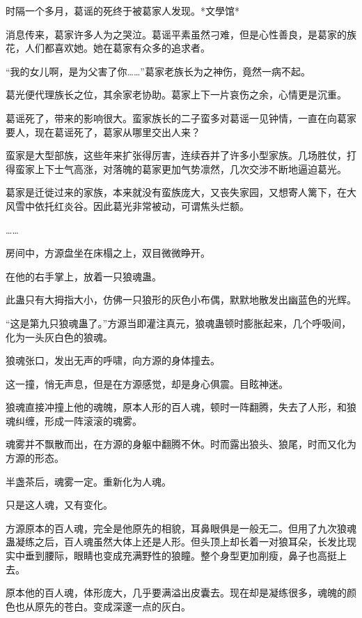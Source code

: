 
\begin{this_body}

时隔一个多月，葛谣的死终于被葛家人发现。*文學馆*

消息传来，葛家许多人为之哭泣。葛谣平素虽然刁难，但是心性善良，是葛家的族花，人们都喜欢她。她在葛家有众多的追求者。

“我的女儿啊，是为父害了你……”葛家老族长为之神伤，竟然一病不起。

葛光便代理族长之位，其余家老协助。葛家上下一片哀伤之余，心情更是沉重。

葛谣死了，带来的影响很大。蛮家族长的二子蛮多对葛谣一见钟情，一直在向葛家要人，现在葛谣死了，葛家从哪里交出人来？

蛮家是大型部族，这些年来扩张得厉害，连续吞并了许多小型家族。几场胜仗，打得蛮家上下士气高涨，对落魄的葛家更加气势凛然，几次交涉不断地逼迫葛光。

葛家是迁徙过来的家族，本来就没有蛮族庞大，又丧失家园，又想寄人篱下，在大风雪中依托红炎谷。因此葛光非常被动，可谓焦头烂额。

……

房间中，方源盘坐在床榻之上，双目微微睁开。

在他的右手掌上，放着一只狼魂蛊。

此蛊只有大拇指大小，仿佛一只狼形的灰色小布偶，默默地散发出幽蓝色的光辉。

“这是第九只狼魂蛊了。”方源当即灌注真元，狼魂蛊顿时膨胀起来，几个呼吸间，化为一头灰白色的狼魂。

狼魂张口，发出无声的呼啸，向方源的身体撞去。

这一撞，悄无声息，但是在方源感觉，却是身心俱震。目眩神迷。

狼魂直接冲撞上他的魂魄，原本人形的百人魂，顿时一阵翻腾，失去了人形，和狼魂纠缠，形成一阵滚滚的魂雾。

魂雾并不飘散而出，在方源的身躯中翻腾不休。时而露出狼头、狼尾，时而又化为方源的形态。

半盏茶后，魂雾一定。重新化为人魂。

只是这人魂，又有变化。

方源原本的百人魂，完全是他原先的相貌，耳鼻眼俱是一般无二。但用了九次狼魂蛊凝练之后，百人魂虽然大体上还是人形。但头顶上却长着一对狼耳朵，长发比现实中垂到腰际，眼睛也变成充满野性的狼瞳。整个身型更加削瘦，鼻子也高挺上去。

原本他的百人魂，体形庞大，几乎要满溢出皮囊去。现在却是凝练很多，魂魄的颜色也从原先的苍白。变成深邃一点的灰白。


\end{this_body}
